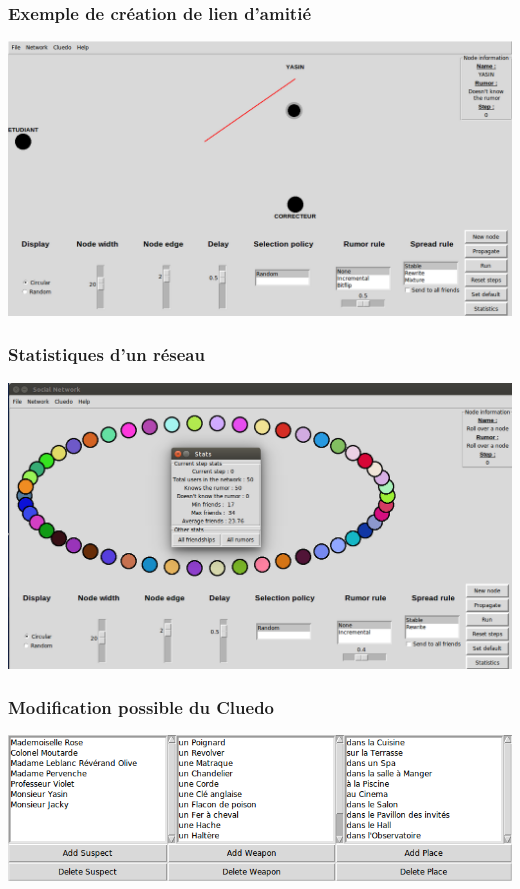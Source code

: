 \documentclass[a4paper,11pt]{article}
\begin{document}
{\subsubsection{Exemple de création de lien d'amitié}
\includegraphics[width=17cm]{Relation.png}
\subsubsection{Statistiques d'un réseau}
\includegraphics[width=17cm]{Stats.png}
\subsubsection{Modification possible du Cluedo}
\includegraphics[width=17cm]{ModifyCluedo.png}

}
\end{document}
